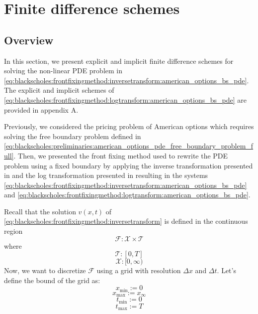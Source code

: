 \section{Finite difference schemes}

\subsection{Overview}

In this section, we present explicit and implicit finite difference schemes
for solving the non-linear PDE problem in
\eqref{eq:blackscholes:frontfixingmethod:inversetransform:american_options_bs_pde}. 
The explicit and implicit schemes of \eqref{eq:blackscholes:frontfixingmethod:logtransform:american_options_bs_pde}
are provided in appendix A.

Previously, we  considered the pricing problem of American options which requires
solving the free boundary problem defined in 
\eqref{eq:blackscholes:preliminaries:american_options_pde_free_boundary_problem_full}.
Then, we presented the front fixing method used to rewrite the PDE problem using
a fixed boundary by applying the inverse transformation presented in \cite{nielsen_2001}
and the log transformation presented in \cite{company_egorova_jodar_2014} resulting
in the systems \eqref{eq:blackscholes:frontfixingmethod:inversetransform:american_options_bs_pde}
and \eqref{eq:blackscholes:frontfixingmethod:logtransform:american_options_bs_pde}. 

Recall that the solution $v(x,t)$ of 
\eqref{eq:blackscholes:frontfixingmethod:inversetransform} 
is defined in the continuous region 
\begin{equation*}
  \mathcal{F}: \mathcal{X} \times \mathcal{T}
\end{equation*}
where
\begin{equation*}
  \mathcal{T}: [0, T]
\end{equation*}
\begin{equation*}
   \mathcal{X}: [0, \infty)
\end{equation*}
Now, we want to discretize $\mathcal{F}$ using a grid with resolution $\Delta x$
and $\Delta t$. Let's define the bound of the grid as:
\begin{equation*}
  x_{\text{min}} := 0
\end{equation*}
\begin{equation*}
  x_{\text{max}} := x_{\infty}
\end{equation*}
\begin{equation*}
  t_{\text{min}} := 0 
\end{equation*}
\begin{equation*}
  t_{\text{max}} := T
\end{equation*}

